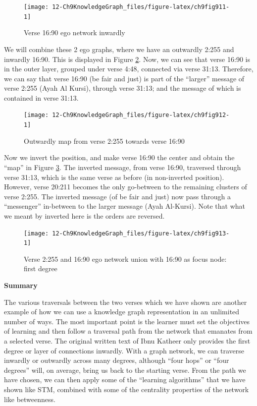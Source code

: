 \documentclass[
]{article}
\begin{document}
\begin{figure}

{\centering \texttt{[image: 12-Ch9KnowledgeGraph\_files/figure-latex/ch9fig911-1]} 

}

\caption{Verse 16:90 ego network inwardly}\label{fig:ch9fig911}
\end{figure}

We will combine these 2 ego graphs, where we have an outwardly 2:255 and inwardly 16:90. This is displayed in Figure \ref{fig:ch9fig912}. Now, we can see that verse 16:90 is in the outer layer, grouped under verse 4:48, connected via verse 31:13. Therefore, we can say that verse 16:90 (be fair and just) is part of the ``larger'' message of verse 2:255 (Ayah Al Kursi), through verse 31:13; and the message of which is contained in verse 31:13.

\begin{figure}

{\centering \texttt{[image: 12-Ch9KnowledgeGraph\_files/figure-latex/ch9fig912-1]} 

}

\caption{Outwardly map from verse 2:255 towards verse 16:90}\label{fig:ch9fig912}
\end{figure}

Now we invert the position, and make verse 16:90 the center and obtain the ``map'' in Figure \ref{fig:ch9fig913}. The inverted message, from verse 16:90, traversed through verse 31:13, which is the same verse as before (in non-inverted position). However, verse 20:211 becomes the only go-between to the remaining clusters of verse 2:255. The inverted message (of be fair and just) now pass through a ``messenger'' in-between to the larger message (Ayah Al-Kursi). Note that what we meant by inverted here is the orders are reversed.

\begin{figure}

{\centering \texttt{[image: 12-Ch9KnowledgeGraph\_files/figure-latex/ch9fig913-1]} 

}

\caption{Verse 2:255 and 16:90 ego network union with 16:90 as focus node: first degree}\label{fig:ch9fig913}
\end{figure}

\textbf{Summary}

The various traversals between the two verses which we have shown are another example of how we can use a knowledge graph representation in an unlimited number of ways. The most important point is the learner must set the objectives of learning and then follow a traversal path from the network that emanates from a selected verse. The original written text of Ibnu Katheer only provides the first degree or layer of connections inwardly. With a graph network, we can traverse inwardly or outwardly across many degrees, although ``four hops'' or ``four degrees'' will, on average, bring us back to the starting verse. From the path we have chosen, we can then apply some of the ``learning algorithms'' that we have shown like STM, combined with some of the centrality properties of the network like betweenness.
\end{document}
